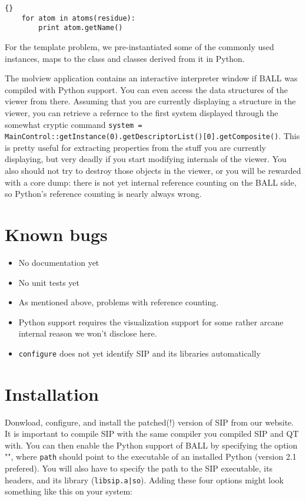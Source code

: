\begin{lstlisting}{}
	for atom in atoms(residue):
		print atom.getName()
\end{lstlisting}

\noindent For the template problem, we pre-instantiated some of the 
commonly used instances, \eg {} maps to the 
 class and classes derived from it in Python.

The molview application contains an interactive interpreter window
if BALL was compiled with Python support. You can even access the
data structures of the viewer from there. Assuming that you are
currently displaying a structure in the viewer, you can retrieve a
refernce to the first system displayed through the somewhat cryptic
command {\tt system =
MainControl::getInstance(0).getDescriptorList()[0].getComposite()}.
This is pretty useful for extracting properties from the stuff you are
currently displaying, but very deadly if you start modifying internals
of the viewer. You also should not try to destroy those objects in the
viewer, or you will be rewarded with a core dump: there is not yet
internal reference counting on the BALL side, so Python's reference
counting is nearly always wrong.
		

\section{Known bugs}
\begin{itemize}
	\item No documentation yet
	\item No unit tests yet
	\item As mentioned above, problems with reference counting.
	\item Python support requires the visualization support for some rather
				arcane internal reason we won't disclose here.
	\item {\tt configure} does not yet identify SIP and its libraries
				automatically
\end{itemize}

\section{Installation}

Donwload, configure, and install the patched(!) version of SIP from our
website. It is important to compile SIP with the same \CPP compiler you
compiled SIP and QT with. You can then enable the Python support of BALL
by specifying the option \mbox{""}, where
{\tt path} should point to the executable of an installed Python (version 2.1
prefered). You will also have to specify the path to the SIP executable, its
headers, and its library ({\tt libsip.a|so}). Adding these four options might
look something like this on your system:

